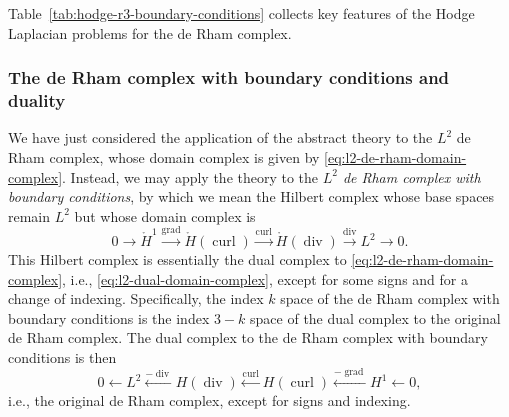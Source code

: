 {Table~\ref{tab:hodge-r3-boundary-conditions} collects key features of the Hodge Laplacian problems for the de Rham complex.}

\subsubsection{{The de Rham complex with boundary conditions and duality}}\label{subsec:de-rham-boundary-duality}

{We have just considered the application of the abstract theory to the $L^2$ de Rham complex, whose domain complex is given by \eqref{eq:l2-de-rham-domain-complex}. Instead, we may apply the theory to the \emph{$L^2$ de Rham complex with boundary conditions}, by which we mean the Hilbert complex whose base spaces remain $L^2$ but whose domain complex is}
\[
0\to\mathring H^1\xrightarrow{\operatorname{grad}}\mathring H(\operatorname{curl})\xrightarrow{\operatorname{curl}}\mathring H(\operatorname{div})\xrightarrow{\operatorname{div}}L^2\to0.
\]
{This Hilbert complex is essentially the dual complex to \eqref{eq:l2-de-rham-domain-complex}, i.e., \eqref{eq:l2-dual-domain-complex}, except for some signs and for a change of indexing. Specifically, the index $k$ space of the de Rham complex with boundary conditions is the index $3-k$ space of the dual complex to the original de Rham complex. The dual complex to the de Rham complex with boundary conditions is then}
\[
0\leftarrow L^2\xleftarrow{-\operatorname{div}}H(\operatorname{div})\xleftarrow{\operatorname{curl}}H(\operatorname{curl})\xleftarrow{-\operatorname{grad}}H^1\leftarrow0,
\]
{i.e., the original de Rham complex, except for signs and indexing.}

